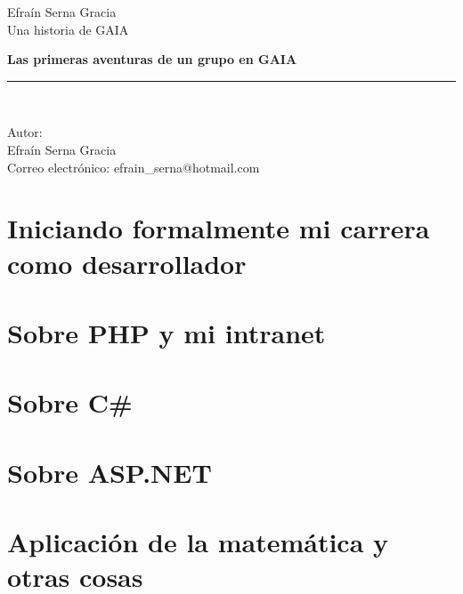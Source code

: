 \documentclass[12pt,spanish,lettersize]{book}
\begin{document}
\begin{titlepage}
\begin{center}
Efra\'in Serna Gracia\\
\vspace*{0.15in}
Una historia de GAIA\\
\vspace*{0.6in}
\vspace*{0.2in}
\begin{Large}
\textbf{Las primeras aventuras de un grupo en GAIA} \\
\end{Large}
\vspace*{0.3in}
\begin{large}

\end{large}
\vspace*{0.3in}
\rule{80mm}{0.1mm}\\
\vspace*{0.1in}
\begin{large}
Autor: \\
Efra\'in Serna Gracia \\
\vspace*{0.3in}
Correo electr\'onico: efrain\_serna@hotmail.com\\
\end{large}
\end{center}
\end{titlepage}
\tableofcontents
\chapter{Iniciando formalmente mi carrera como desarrollador}

\chapter{Sobre PHP y mi intranet}

\chapter{Sobre C\#}

\chapter{Sobre ASP.NET}

\chapter{Aplicaci\'on de la matem\'atica y otras cosas}
\end{document}
